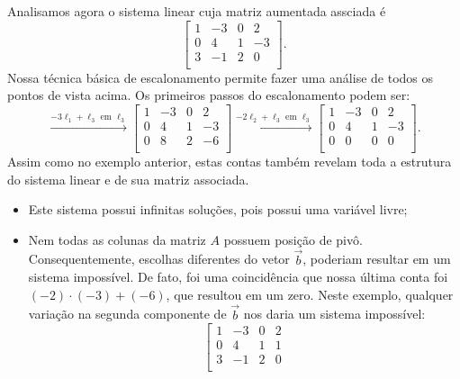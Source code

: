 \documentclass[../livro.tex]{subfiles}  %
\begin{document}
\begin{example}
	Analisamos agora o sistema linear cuja matriz aumentada assciada é
	\begin{equation}
	\left[
	\begin{array}{ccc|c}
	1 & -3 & 0 & 2 \\
	0 &  4 & 1 & -3 \\
	3 & -1 & 2 & 0 \\
	\end{array}
	\right].
	\end{equation} Nossa técnica básica de escalonamento permite fazer uma análise de todos os pontos de vista acima. Os primeiros passos do escalonamento podem ser:
	\begin{equation}
	\xrightarrow{-3\ell_1 + \ell_3 \text{ em } \ell_3}
	\left[
	\begin{array}{ccc|c}
	1 & -3 & 0 & 2 \\
	0 &  4 & 1 & -3 \\
	0 &  8 & 2 & -6 \\
	\end{array}
	\right] \xrightarrow{-2\ell_2 + \ell_3 \text{ em } \ell_3}
	\left[
	\begin{array}{ccc|c}
	1 & -3 & 0 & 2 \\
	0 &  4 & 1 & -3 \\
	0 &  0 & 0 & 0 \\
	\end{array}
	\right].
	\end{equation} Assim como no exemplo anterior, estas contas também revelam toda a estrutura do sistema linear e de sua matriz associada.
	\begin{itemize}
		\item Este sistema possui infinitas soluções, pois possui uma variável livre;
		\item Nem todas as colunas da matriz $A$ possuem posição de pivô. Consequentemente, escolhas diferentes do vetor $\vec{b}$, poderiam resultar em um sistema impossível. De fato, foi uma coincidência que nossa última conta foi $(-2)\cdot (-3) + (-6)$, que resultou em um zero. Neste exemplo, qualquer variação na segunda componente de $\vec{b}$ nos daria um sistema impossível:
		\begin{equation}
		\left[
		\begin{array}{ccc|c}
		1 & -3 & 0 & 2 \\
		0 &  4 & 1 & 1 \\
		3 & -1 & 2 & 0 \\
		\end{array}

\end{equation}
\end{itemize}
\end{example}
\end{document}
